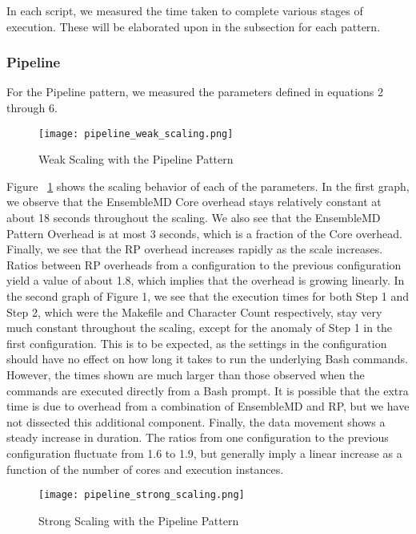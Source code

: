 \documentclass[]{article}
\begin{document}
			In each script, we measured the time taken to complete various stages of execution. These will be elaborated upon in the subsection for each pattern.

		\subsubsection{Pipeline}
			For the Pipeline pattern, we measured the parameters defined in equations 2 through 6. 

			\begin{figure}[H]
				\centering
				\texttt{[image: pipeline\_weak\_scaling.png]}
				\caption{Weak Scaling with the Pipeline Pattern}
				\label{fig:pipeline_weak_scaling}
			\end{figure}

			Figure ~\ref{fig:pipeline_weak_scaling} shows the scaling behavior of each of the parameters. In the first graph, we observe that the EnsembleMD Core overhead stays relatively constant at about 18 seconds throughout the scaling. We also see that the EnsembleMD Pattern Overhead is at most 3 seconds, which is a fraction of the Core overhead. Finally, we see that the RP overhead increases rapidly as the scale increases. Ratios between RP overheads from a configuration to the previous configuration yield a value of about 1.8, which implies that the overhead is growing linearly.
			In the second graph of Figure 1, we see that the execution times for both Step 1 and Step 2, which were the Makefile and Character Count respectively, stay very much constant throughout the scaling, except for the anomaly of Step 1 in the first configuration. This is to be expected, as the settings in the configuration should have no effect on how long it takes to run the underlying Bash commands. However, the times shown are much larger than those observed when the commands are executed directly from a Bash prompt. It is possible that the extra time is due to overhead from a combination of EnsembleMD and RP, but we have not dissected this additional component.
			Finally, the data movement shows a steady increase in duration. The ratios from one configuration to the previous configuration fluctuate from 1.6 to 1.9, but generally imply a linear increase as a function of the number of cores and execution instances. 


			\begin{figure}[H]
				\centering
				\texttt{[image: pipeline\_strong\_scaling.png]}
				\caption{Strong Scaling with the Pipeline Pattern}
				\label{fig:pipeline_strong_scaling}
			\end{figure}
\end{document}
